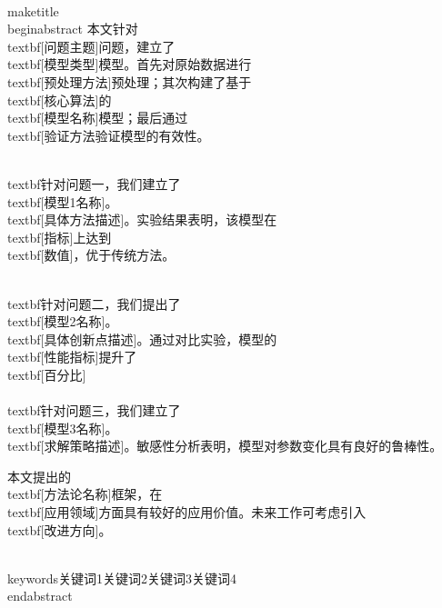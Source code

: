 \\maketitle
\\begin{abstract}
    本文针对\\textbf{[问题主题]}问题，建立了\\textbf{[模型类型]}模型。首先对原始数据进行\\textbf{[预处理方法]}预处理；其次构建了基于\\textbf{[核心算法]}的\\textbf{[模型名称]}模型；最后通过\\textbf{[验证方法}验证模型的有效性。
    
    \\textbf{针对问题一}，我们建立了\\textbf{[模型1名称]}。\\textbf{[具体方法描述]}。实验结果表明，该模型在\\textbf{[指标]}上达到\\textbf{[数值]}，优于传统方法。
    
    \\textbf{针对问题二}，我们提出了\\textbf{[模型2名称]}。\\textbf{[具体创新点描述]}。通过对比实验，模型的\\textbf{[性能指标]}提升了\\textbf{[百分比]}\\%
    
    \\textbf{针对问题三}，我们建立了\\textbf{[模型3名称]}。\\textbf{[求解策略描述]}。敏感性分析表明，模型对参数变化具有良好的鲁棒性。
    
    本文提出的\\textbf{[方法论名称]}框架，在\\textbf{[应用领域]}方面具有较好的应用价值。未来工作可考虑引入\\textbf{[改进方向]}。
    
    \\keywords{关键词1\quad 关键词2\quad 关键词3\quad 关键词4}
\\end{abstract}
